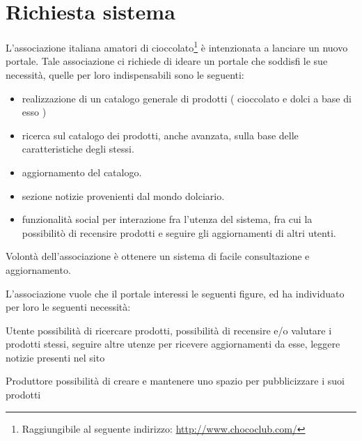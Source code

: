 \chapter{Richiesta sistema}

L’associazione italiana amatori di cioccolato\footnote{Raggiungibile al seguente indirizzo: \url{http://www.chococlub.com/}} è intenzionata a lanciare un nuovo portale.
Tale associazione ci richiede di ideare un portale che soddisfi le sue necessità, quelle per loro indispensabili sono le seguenti:
\begin{itemize}
	\item realizzazione di un catalogo generale di prodotti ( cioccolato e dolci a base di esso ) 
	\item ricerca sul catalogo dei prodotti, anche avanzata, sulla base delle caratteristiche degli stessi.
	\item aggiornamento del catalogo.
	\item sezione notizie provenienti dal mondo dolciario.
	\item funzionalità social per interazione fra l'utenza del sistema, fra cui la possibilitò di recensire prodotti e seguire gli aggiornamenti di altri utenti.
\end{itemize}
Volontà dell'associazione è ottenere un sistema di facile consultazione e aggiornamento.

L'associazione vuole che il portale interessi le seguenti figure, ed ha individuato per loro le seguenti necessità:
\begin{descriptionInd}
	\item[Utente] possibilità di ricercare prodotti, possibilità di recensire e/o valutare i prodotti stessi, seguire altre utenze per ricevere aggiornamenti da esse, leggere notizie presenti nel sito
	\item[Produttore] possibilità di creare e mantenere uno spazio per pubblicizzare i suoi prodotti
\end{descriptionInd}




